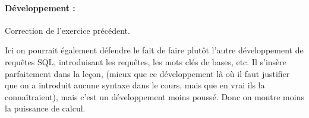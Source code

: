 \paragraph{Développement :} Correction de l'exercice précédent.

\begin{com}
	Ici on pourrait également défendre le fait de faire plutôt l'autre développement de requêtes SQL, introduisant les requêtes, les mots clés de bases, etc. Il s'insère parfaitement dans la leçon, (mieux que ce développement là où il faut justifier que on a introduit aucune syntaxe dans le cours, mais que en vrai ils la connaîtraient), mais c'est un développement moins poussé. Donc on montre moins la puissance de calcul.
\end{com}

